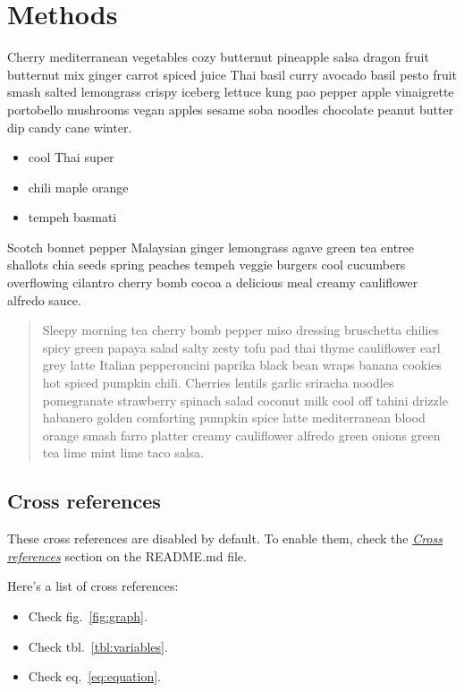 \documentclass[
  11pt,
,
onecolumn,
openany
]{book}
\providecommand{\tightlist}{%
  \setlength{\itemsep}{0pt}\setlength{\parskip}{0pt}}
\begin{document}
\hypertarget{methods}{%
\section{Methods}\label{methods}}

Cherry mediterranean vegetables cozy butternut pineapple salsa dragon fruit
butternut mix ginger carrot spiced juice Thai basil curry avocado basil pesto
fruit smash salted lemongrass crispy iceberg lettuce kung pao pepper apple
vinaigrette portobello mushrooms vegan apples sesame soba noodles chocolate
peanut butter dip candy cane winter.

\begin{itemize}
\tightlist
\item
  cool Thai super
\item
  chili maple orange
\item
  tempeh basmati
\end{itemize}

Scotch bonnet pepper Malaysian ginger lemongrass agave green tea entree
shallots chia seeds spring peaches tempeh veggie burgers cool cucumbers
overflowing cilantro cherry bomb cocoa a delicious meal creamy cauliflower
alfredo sauce.

\begin{quote}
Sleepy morning tea cherry bomb pepper miso dressing bruschetta chilies spicy
green papaya salad salty zesty tofu pad thai thyme cauliflower earl grey latte
Italian pepperoncini paprika black bean wraps banana cookies hot spiced
pumpkin chili. Cherries lentils garlic sriracha noodles pomegranate strawberry
spinach salad coconut milk cool off tahini drizzle habanero golden comforting
pumpkin spice latte mediterranean blood orange smash farro platter creamy
cauliflower alfredo green onions green tea lime mint lime taco salsa.
\end{quote}

\hypertarget{cross-references}{%
\subsection{Cross references}\label{cross-references}}

These cross references are disabled by default. To enable them, check the
\emph{\href{https://github.com/wikiti/pandoc-book-template\#cross-references}{Cross
references}} section on the README.md file.

Here's a list of cross references:

\begin{itemize}
\tightlist
\item
  Check fig.~\ref{fig:graph}.
\item
  Check tbl.~\ref{tbl:variables}.
\item
  Check eq.~\ref{eq:equation}.
\end{itemize}
\end{document}
